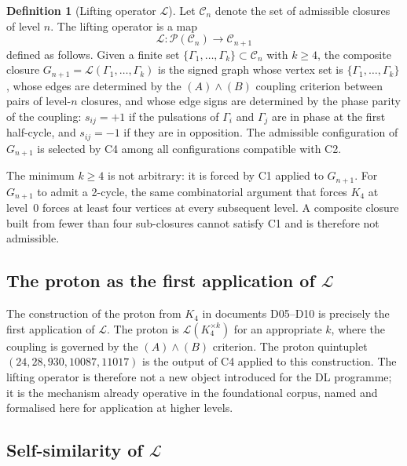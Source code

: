 \documentclass[12pt,a4paper]{article}
\theoremstyle{plain}
\theoremstyle{definition}
\newtheorem{definition}[theorem]{Definition}
\theoremstyle{remark}
\newcommand{\Kfour}{K_4}
\newcommand{\Calg}{\mathcal{C}}
\newcommand{\Lop}{\mathcal{L}}
\begin{document}
\begin{definition}[Lifting operator $\Lop$]
\label{def:lifting}
Let $\Calg_n$ denote the set of admissible closures of level $n$. The lifting
operator is a map
\begin{equation}
\Lop : \mathcal{P}(\Calg_n) \to \Calg_{n+1}
\end{equation}
defined as follows. Given a finite set $\{\Gamma_1, \ldots, \Gamma_k\} \subset
\Calg_n$ with $k \geq 4$, the composite closure $G_{n+1} = \Lop(\Gamma_1, \ldots,
\Gamma_k)$ is the signed graph whose vertex set is $\{\Gamma_1, \ldots, \Gamma_k\}$,
whose edges are determined by the $(A)\wedge(B)$ coupling criterion between pairs of
level-$n$ closures, and whose edge signs are determined by the phase parity of the
coupling: $s_{ij} = +1$ if the pulsations of $\Gamma_i$ and $\Gamma_j$ are in phase
at the first half-cycle, and $s_{ij} = -1$ if they are in opposition. The admissible
configuration of $G_{n+1}$ is selected by C4 among all configurations compatible
with C2.
\end{definition}

The minimum $k \geq 4$ is not arbitrary: it is forced by C1 applied to $G_{n+1}$.
For $G_{n+1}$ to admit a 2-cycle, the same combinatorial argument that forces
$\Kfour$ at level~0 forces at least four vertices at every subsequent level. A
composite closure built from fewer than four sub-closures cannot satisfy C1 and is
therefore not admissible.

\subsection{The proton as the first application of \texorpdfstring{$\Lop$}{L}}

The construction of the proton from $\Kfour$ in documents D05--D10 is precisely the
first application of $\Lop$. The proton is $\Lop(\Kfour^{\times k})$ for an
appropriate $k$, where the coupling is governed by the $(A)\wedge(B)$ criterion. The
proton quintuplet $(24, 28, 930, 10087, 11017)$ is the output of C4 applied to this
construction. The lifting operator is therefore not a new object introduced for the
DL programme; it is the mechanism already operative in the foundational corpus,
named and formalised here for application at higher levels.

\subsection{Self-similarity of \texorpdfstring{$\Lop$}{L}}
\end{document}
